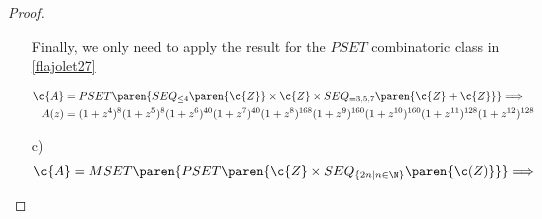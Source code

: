 \begin{proof}
\begin{itemize}
            Finally, we only need to apply the result for the $PSET$ combinatoric class in \eqref{flajolet27}
            
            \begin{align}
                    \c{A} &= 
                    PSET\paren{ SEQ_{\leq 4} \paren{\c{Z}} \times \c{Z} \times SEQ_{=3,5,7}\paren{ \c{Z} + \c{Z} } } \Longrightarrow \\
                    A(z) &= (1 + z^4)^{8}(1 + z^5)^{8}(1 + z^6)^{40}(1 + z^7)^{40}(1 + z^8)^{168}(1 + z^9)^{160}(1 + z^{10})^{160}(1 + z^{11})^{128}(1 + z^{12})^{128}                   
            \end{align}
            
        \item[c)]
            \begin{align}
                    \c{A} = 
                    MSET\paren{ PSET\paren{ \c{Z} \times SEQ_{\{ 2n | n \in \N \}}\paren{\c(Z) } } }
                    \Longrightarrow
            \end{align}
    \end{itemize}
\end{proof}